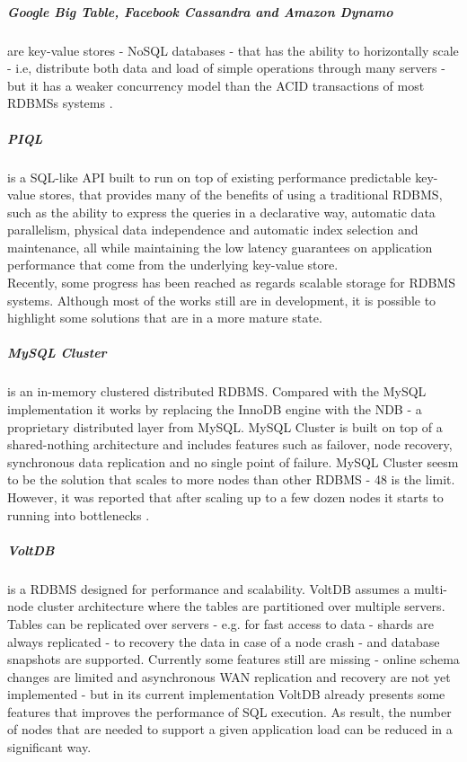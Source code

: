\subparagraph{Google Big Table, Facebook Cassandra and  Amazon Dynamo} \cite{chang2008bigtable} \cite{lakshman2010cassandra}
\cite{decandia2007dynamo} are key-value stores - \gls{NoSQL} databases - that has the ability to horizontally scale - i.e,
distribute both data and load of simple operations through many servers - but it has a weaker concurrency model
than the ACID transactions of most \glspl{RDBMS} systems \cite{cattell2011scalable}.

\subparagraph{\gls{PIQL}} \cite{armbrust2010piql} is a SQL-like API built to run on top of existing
performance predictable key-value stores, that provides many of the benefits of using a traditional
\gls{RDBMS}, such as the ability to express the queries in a declarative way, automatic data
parallelism, physical data independence and automatic index selection and maintenance, all while
maintaining the low latency guarantees on application performance that come from the underlying
key-value store.\\

Recently, some progress has been reached as regards scalable storage for \gls{RDBMS} systems. Although most
of the works still are in development, it is possible to highlight some solutions that are in a more
mature state.

\subparagraph{MySQL Cluster} \cite{ronstrom2004mysql} is an in-memory clustered distributed \gls{RDBMS}.
Compared with the MySQL implementation it works by replacing the InnoDB engine with the NDB - a proprietary
distributed layer from MySQL. MySQL Cluster is built on top of a shared-nothing architecture and includes
features such as failover, node recovery, synchronous data replication and no single point of failure.
MySQL Cluster seesm to be the solution that scales to more nodes than other \gls{RDBMS} - 48 is the limit.
However, it was reported that after scaling up to a few dozen nodes it starts to running into
bottlenecks \cite{bunch2010evaluation}.

\subparagraph{VoltDB} \cite{stonebraker2013voltdb} is a \gls{RDBMS} designed for performance and scalability.
VoltDB assumes a multi-node cluster architecture where the tables are partitioned over multiple servers.
Tables can be replicated over servers - e.g. for fast access to data - shards are always replicated -
to recovery the data in case of a node crash - and database snapshots are supported. Currently some
features still are missing - online schema changes are limited and asynchronous \gls{WAN} replication and
recovery are not yet implemented - but in its current implementation VoltDB already presents some
features that improves the performance of SQL execution. As result, the number of nodes that are
needed to support a given application load can be reduced in a significant way.

